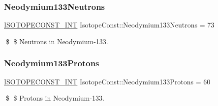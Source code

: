 \subsubsection{\texorpdfstring{Neodymium133\+Neutrons}{Neodymium133Neutrons}}
{\footnotesize\ttfamily \mbox{\hyperlink{group___isotope_const-_macros_ga5f18360b3e99483a35c32d789e62621c}{I\+S\+O\+T\+O\+P\+E\+C\+O\+N\+S\+T\+\_\+\+I\+NT}} Isotope\+Const\+::\+Neodymium133\+Neutrons = 73}

\$ \$ Neutrons in Neodymium-\/133. \mbox{\label{group___isotope_const-_neodymium-_nd133_ga635839c562f81fcdf0ba1e40a73b3df5}} 
\subsubsection{\texorpdfstring{Neodymium133\+Protons}{Neodymium133Protons}}
{\footnotesize\ttfamily \mbox{\hyperlink{group___isotope_const-_macros_ga5f18360b3e99483a35c32d789e62621c}{I\+S\+O\+T\+O\+P\+E\+C\+O\+N\+S\+T\+\_\+\+I\+NT}} Isotope\+Const\+::\+Neodymium133\+Protons = 60}

\$ \$ Protons in Neodymium-\/133. 